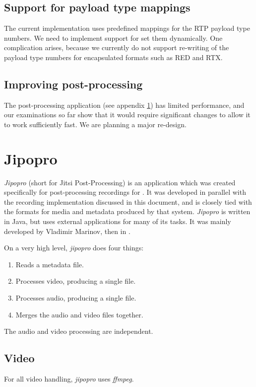 \documentclass[twoside,openright,a4paper,12pt,english]{article}
\begin{document}
\subsection{Support for payload type mappings}
The current implementation uses predefined mappings for the RTP payload type
numbers. We need to implement support for set them dynamically. One complication arises,
because we currently do not support re-writing of the payload type numbers for encapsulated
formats such as RED and RTX.

\subsection{Improving post-processing}
The post-processing application (see appendix \ref{jipopro}) has limited performance, and
our examinations so far show that it would require significant changes to allow
it to work sufficiently fast. We are planning a major re-design.





\clearpage
\appendix
\section{Jipopro}
\label{jipopro}
\emph{Jipopro} (short for Jitsi Post-Processing) is an application which was created
specifically for post-processing recordings for \jm. It was developed in parallel with
the recording implementation discussed in this document, and is closely tied
with the formats for media and metadata produced by that system. \emph{Jipopro}
is written in Java, but uses external applications for many of its tasks. It was
mainly developed by Vladimir Marinov, then in \bj.

On a very high level, \emph{jipopro} does four things:
\begin{enumerate}
\item Reads a metadata file.
\item Processes video, producing a single file.
\item Processes audio, producing a single file.
\item Merges the audio and video files together.
\end{enumerate}

The audio and video processing are independent.


\subsection{Video}
For all video handling, \emph{jipopro} uses \emph{ffmpeg}\cite{ffmpeg}.
\end{document}
